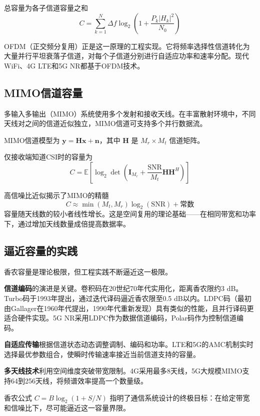 总容量为各子信道容量之和
\begin{equation}
    C = \sum_{k=1}^N \Delta f \log_2\left(1 + \frac{P_k |H_k|^2}{N_0}\right)
\end{equation}

OFDM（正交频分复用）正是这一原理的工程实现。它将频率选择性信道转化为大量并行平坦衰落子信道，对每个子信道分别进行自适应功率和速率分配。现代WiFi、4G LTE和5G NR都基于OFDM技术。

\subsection{MIMO信道容量}

多输入多输出（MIMO）系统使用多个发射和接收天线。在丰富散射环境中，不同天线对之间的信道近似独立，MIMO信道可支持多个并行数据流。

MIMO信道模型为 $\mathbf{y} = \mathbf{H}\mathbf{x} + \mathbf{n}$，其中 $\mathbf{H}$ 是 $M_r \times M_t$ 信道矩阵。

仅接收端知道CSI时的容量为
\begin{equation}
    C = \mathbb{E}\left[\log_2 \det\left(\mathbf{I}_{M_r} + \frac{\text{SNR}}{M_t}\mathbf{H}\mathbf{H}^H\right)\right]
\end{equation}

高信噪比近似揭示了MIMO的精髓
\begin{equation}
    C \approx \min(M_t, M_r) \log_2(\text{SNR}) + \text{常数}
\end{equation}
容量随天线数的较小者线性增长。这是空间复用的理论基础——在相同带宽和功率下，通过增加天线数量成倍提高数据率。

\subsection{逼近容量的实践}

香农容量是理论极限，但工程实践不断逼近这一极限。

\textbf{信道编码}的演进是关键。卷积码在20世纪70年代实用化，距离香农限约3 dB。Turbo码于1993年提出，通过迭代译码逼近香农限至0.5 dB以内。LDPC码（最初由Gallager在1960年代提出，1990年代重新发现）具有类似的性能，且并行译码更适合硬件实现。5G NR采用LDPC作为数据信道编码，Polar码作为控制信道编码。

\textbf{自适应传输}根据信道状态动态调整调制、编码和功率。LTE和5G的AMC机制实时选择最优参数组合，使瞬时传输速率接近当前信道支持的容量。

\textbf{多天线技术}利用空间维度突破带宽限制。4G采用最多8天线，5G大规模MIMO支持64到256天线，将频谱效率提高一个数量级。

香农公式 $C = B \log_2(1 + S/N)$ 指明了通信系统设计的终极目标：在给定带宽和信噪比下，尽可能逼近这一容量界限。
